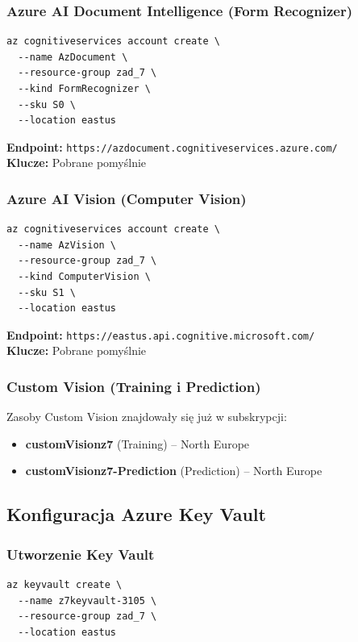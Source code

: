\documentclass[twoside]{article}
\begin{document}
\subsubsection{Azure AI Document Intelligence (Form Recognizer)}
\begin{verbatim}
az cognitiveservices account create \
  --name AzDocument \
  --resource-group zad_7 \
  --kind FormRecognizer \
  --sku S0 \
  --location eastus
\end{verbatim}

\textbf{Endpoint:} \texttt{https://azdocument.cognitiveservices.azure.com/} \\
\textbf{Klucze:} Pobrane pomyślnie

\subsubsection{Azure AI Vision (Computer Vision)}
\begin{verbatim}
az cognitiveservices account create \
  --name AzVision \
  --resource-group zad_7 \
  --kind ComputerVision \
  --sku S1 \
  --location eastus
\end{verbatim}

\textbf{Endpoint:} \texttt{https://eastus.api.cognitive.microsoft.com/} \\
\textbf{Klucze:} Pobrane pomyślnie

\subsubsection{Custom Vision (Training i Prediction)}
Zasoby Custom Vision znajdowały się już w subskrypcji:
\begin{itemize}
	\item \textbf{customVisionz7} (Training) – North Europe
	\item \textbf{customVisionz7-Prediction} (Prediction) – North Europe
\end{itemize}

\subsection{Konfiguracja Azure Key Vault}

\subsubsection{Utworzenie Key Vault}
\begin{verbatim}
az keyvault create \
  --name z7keyvault-3105 \
  --resource-group zad_7 \
  --location eastus
\end{verbatim}
\end{document}
